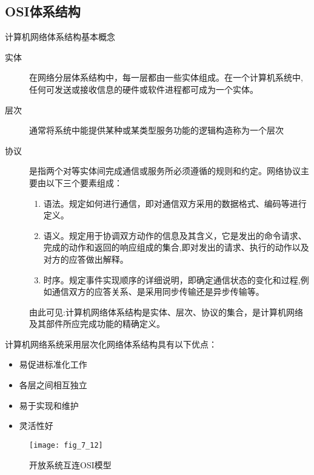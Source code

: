 \subsection{OSI体系结构}

计算机网络体系结构基本概念
\begin{description}
  \item[实体] 在网络分层体系结构中，每一层都由一些实体组成。在一个计算机系统中,任何可发送或接收信息的硬件或软件进程都可成为一个实体。
  \item[层次]通常将系统中能提供某种或某类型服务功能的逻辑构造称为一个层次
  \item[协议] 是指两个对等实体间完成通信或服务所必须遵循的规则和约定。网络协议主要由以下三个要素组成：
  \begin{enumerate}
    \item 语法。规定如何进行通信，即对通信双方采用的数据格式、编码等进行定义。

    \item 语义。规定用于协调双方动作的信息及其含义，它是发出的命令请求、完成的动作和返回的响应组成的集合,即对发出的请求、执行的动作以及对方的应答做出解释。

    \item 时序。规定事件实现顺序的详细说明，即确定通信状态的变化和过程,例如通信双方的应答关系、是采用同步传输还是异步传输等。

  \end{enumerate}
由此可见:计算机网络体系结构是实体、层次、协议的集合，是计算机网络及其部件所应完成功能的精确定义。

\end{description}


计算机网络系统采用层次化网络体系结构具有以下优点：

\begin{itemize}
  \item 易促进标准化工作

  \item 各层之间相互独立

  \item 易于实现和维护
\item 灵活性好

\end{itemize}




\begin{figure}
  \centering
  \texttt{[image: fig\_7\_12]}
  \caption{开放系统互连OSI模型}\label{fig_7_12}
\end{figure}



